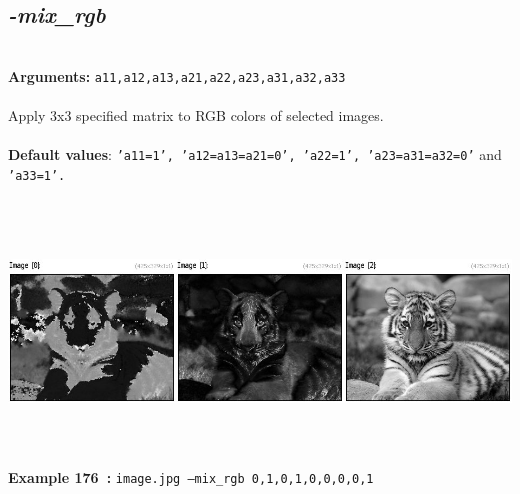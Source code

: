 \documentclass[a4paper,11pt,twoside]{book}
\begin{document}
\subsection{\emph{-mix\_rgb} }\vspace*{-0.5em}
~\\\textbf{Arguments: } 
{\small \texttt{a11,a12,a13,a21,a22,a23,a31,a32,a33}}\\~\\
Apply 3x3 specified matrix to RGB colors of selected images.
~\\~\\\textbf{Default values}: {\small \texttt{'a11=1', 'a12=a13=a21=0', 'a22=1', 'a23=a31=a32=0'} and \texttt{'a33=1'.}}
\begin{center}\includegraphics[keepaspectratio=true,height=7cm,width=\textwidth]{img/gmic_def176.jpg}\\
{\footnotesize \textbf{Example 176~:} \texttt{image.jpg --mix\_rgb 0,1,0,1,0,0,0,0,1}}
\end{center}
\end{document}
